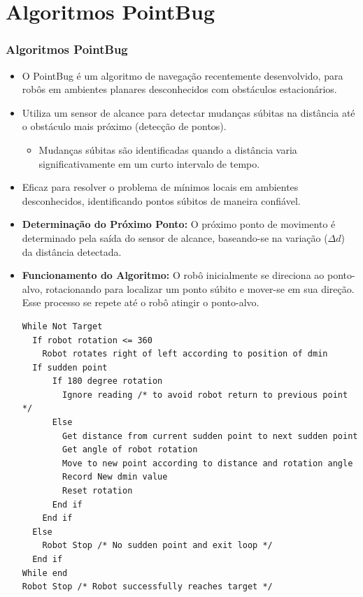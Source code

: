 \documentclass[xcolor=dvipsnames, aspectratio=169]{beamer}
\begin{document}
\section{Algoritmos PointBug}
\begin{frame}
  \frametitle{Algoritmos PointBug}
  \begin{itemize}
    \item O PointBug é um algoritmo de navegação recentemente desenvolvido, para robôs em ambientes planares desconhecidos com obstáculos estacionários.
    \item Utiliza um sensor de alcance para detectar mudanças súbitas na distância até o obstáculo mais próximo (detecção de pontos).
    \begin{itemize}
      \item Mudanças súbitas são identificadas quando a distância varia significativamente em um curto intervalo de tempo.
    \end{itemize}
    \item Eficaz para resolver o problema de mínimos locais em ambientes desconhecidos, identificando pontos súbitos de maneira confiável.
    \item \textbf{Determinação do Próximo Ponto:} O próximo ponto de movimento é determinado pela saída do sensor de alcance, baseando-se na variação ($\Delta{d}$) da distância detectada.
    \item \textbf{Funcionamento do Algoritmo:} O robô inicialmente se direciona ao ponto-alvo, rotacionando para localizar um ponto súbito e mover-se em sua direção. Esse processo se repete até o robô atingir o ponto-alvo.
\begin{lstlisting}
While Not Target
  If robot rotation <= 360
    Robot rotates right of left according to position of dmin
  If sudden point
      If 180 degree rotation
        Ignore reading /* to avoid robot return to previous point */
      Else
        Get distance from current sudden point to next sudden point
        Get angle of robot rotation
        Move to new point according to distance and rotation angle
        Record New dmin value
        Reset rotation
      End if
    End if
  Else
    Robot Stop /* No sudden point and exit loop */
  End if
While end
Robot Stop /* Robot successfully reaches target */
\end{lstlisting}
  \end{itemize}

\end{frame}
\end{document}
